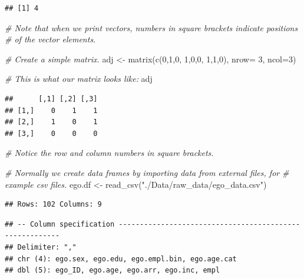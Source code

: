 \documentclass[
]{book}
\newenvironment{Shaded}{\begin{snugshade}}{\end{snugshade}}
\newcommand{\AttributeTok}[1]{\textcolor[rgb]{0.77,0.63,0.00}{#1}}
\newcommand{\CommentTok}[1]{\textcolor[rgb]{0.56,0.35,0.01}{\textit{#1}}}
\newcommand{\DecValTok}[1]{\textcolor[rgb]{0.00,0.00,0.81}{#1}}
\newcommand{\FunctionTok}[1]{\textcolor[rgb]{0.00,0.00,0.00}{#1}}
\newcommand{\NormalTok}[1]{#1}
\newcommand{\OtherTok}[1]{\textcolor[rgb]{0.56,0.35,0.01}{#1}}
\newcommand{\StringTok}[1]{\textcolor[rgb]{0.31,0.60,0.02}{#1}}
\begin{document}
\begin{verbatim}
## [1] 4
\end{verbatim}

\begin{Shaded}
\begin{Highlighting}[]
\CommentTok{\# Note that when we print vectors, numbers in square brackets indicate positions}
\CommentTok{\# of the vector elements.}

\CommentTok{\# Create a simple matrix.}
\NormalTok{adj }\OtherTok{\textless{}{-}} \FunctionTok{matrix}\NormalTok{(}\FunctionTok{c}\NormalTok{(}\DecValTok{0}\NormalTok{,}\DecValTok{1}\NormalTok{,}\DecValTok{0}\NormalTok{, }\DecValTok{1}\NormalTok{,}\DecValTok{0}\NormalTok{,}\DecValTok{0}\NormalTok{, }\DecValTok{1}\NormalTok{,}\DecValTok{1}\NormalTok{,}\DecValTok{0}\NormalTok{), }\AttributeTok{nrow=} \DecValTok{3}\NormalTok{, }\AttributeTok{ncol=}\DecValTok{3}\NormalTok{)}

\CommentTok{\# This is what our matrix looks like:}
\NormalTok{adj}
\end{Highlighting}
\end{Shaded}

\begin{verbatim}
##      [,1] [,2] [,3]
## [1,]    0    1    1
## [2,]    1    0    1
## [3,]    0    0    0
\end{verbatim}

\begin{Shaded}
\begin{Highlighting}[]
\CommentTok{\# Notice the row and column numbers in square brackets. }

\CommentTok{\# Normally we create data frames by importing data from external files, for}
\CommentTok{\# example csv files.}
\NormalTok{ego.df }\OtherTok{\textless{}{-}} \FunctionTok{read\_csv}\NormalTok{(}\StringTok{"./Data/raw\_data/ego\_data.csv"}\NormalTok{)}
\end{Highlighting}
\end{Shaded}

\begin{verbatim}
## Rows: 102 Columns: 9
\end{verbatim}

\begin{verbatim}
## -- Column specification --------------------------------------------------------
## Delimiter: ","
## chr (4): ego.sex, ego.edu, ego.empl.bin, ego.age.cat
## dbl (5): ego_ID, ego.age, ego.arr, ego.inc, empl
\end{verbatim}
\end{document}
